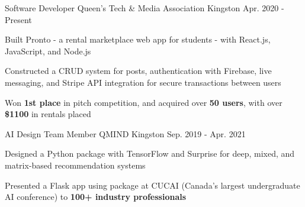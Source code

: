 

\begin{cventries}

  \cventry
    {Software Developer} %
    {Queen’s Tech \& Media Association} %
    {Kingston} %
    {Apr. 2020 - Present} %
    {
      \begin{cvitems} %
        \item {Built Pronto - a rental marketplace web app for students - with React.js, JavaScript, and Node.js}
        \item {Constructed a CRUD system for posts, authentication with Firebase, live messaging, and Stripe API integration for secure transactions between users}
        \item {Won \textbf{1st place} in pitch competition, and acquired over \textbf{50 users}, with over \textbf{\$1100} in rentals placed}
      \end{cvitems}
    }

  \cventry
    {AI Design Team Member} %
    {QMIND} %
    {Kingston} %
    {Sep. 2019 - Apr. 2021} %
    {
      \begin{cvitems} %
        \item {Designed a Python package with TensorFlow and Surprise for deep, mixed, and matrix-based recommendation systems}
        \item {Presented a Flask app using package at CUCAI (Canada’s largest undergraduate AI conference) to \textbf{100+ industry professionals}}
      \end{cvitems}
    }


\end{cventries}
